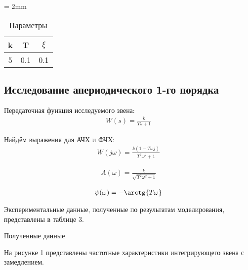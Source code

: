 \documentclass[a4paper, 11pt]{article}
\begin{document}
\begin{table}[h!]
    \tabulinesep = 2mm
    \centering
    \begin{threeparttable}
    	\caption{Параметры}\label{tab:perflogcross}
    	\begin{tabular}{|c|c|c|}
    		\hline
        	k & T & $\xi$ \\ \hline
        	5 & 0.1 & 0.1 \\
        	\hline
    	\end{tabular}
    \end{threeparttable} 
\end{table}

\newpage
\begin{center}
	\section{Исследование апериодического 1-го порядка}
\end{center}

\par 
Передаточная функция исследуемого звена:
\begin{align}
	W(s)=\frac{k}{Ts+1}
\end{align}
\par 
Найдём выражения для АЧХ и ФЧХ:
\begin{align}
W(j\omega) = \frac{k(1-T\omega j)}{T^2\omega^2 + 1}
\end{align}

\begin{align}
	A(\omega) = \frac{k}{\sqrt{T^2\omega^2 + 1}}
\end{align}
	
\begin{align}
	\psi(\omega) =-\arctg{T\omega}
\end{align}

\par 
Экспериментальные данные, полученные по результатам моделирования, представлены в таблице 3.
\begin{table}[h!]
    \centering
    \begin{threeparttable}
        \caption{Полученные данные} \label{tab:perflogcross}
    \end{threeparttable}
\end{table}

\newpage
\par 
На рисунке 1 представлены частотные характеристики интегрирующего звена с замедлением.
\end{document}
